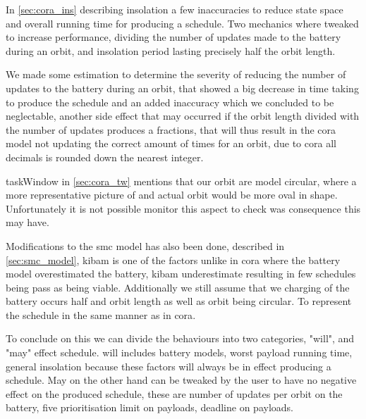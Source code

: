 In \cref{sec:cora_ins} describing insolation a few inaccuracies to reduce state space and overall running time for producing a schedule. Two mechanics where tweaked to increase performance, dividing the number of updates made to the battery during an orbit, and insolation period lasting precisely half the orbit length.

We made some estimation to determine the severity of reducing the number of updates to the battery during an orbit, that showed a big decrease in time taking to produce the schedule and an added inaccuracy which we concluded to be neglectable, another side effect that may occurred  if the orbit length divided with the number of updates produces a fractions, that will thus result in the \gls{cora} model not updating the correct amount of times for an orbit, due to \gls{cora} all decimals is rounded down the nearest integer.

taskWindow in \cref{sec:cora_tw} mentions that our orbit are model circular, where a more representative picture of and actual orbit would be more oval in shape. Unfortunately it is not possible monitor this aspect to check was consequence this may have.

Modifications to the \gls{smc} model has also been done, described in \cref{sec:smc_model}, \gls{kibam} is one of the factors unlike in \gls{cora} where the battery model overestimated the battery, \gls{kibam} underestimate resulting in few schedules being pass as being viable. Additionally we still assume that we charging of the battery occurs half and orbit length as well as orbit being circular. To represent the schedule in the same manner as in \gls{cora}.

To conclude on this we can divide the behaviours into two categories, "will", and "may" effect schedule. will includes battery models, worst payload running time, general insolation because these factors will always be in effect producing a schedule. May on the other hand can be tweaked by the user to have no negative effect on the produced schedule, these are number of updates per orbit on the battery, five prioritisation limit on payloads, deadline on payloads.







